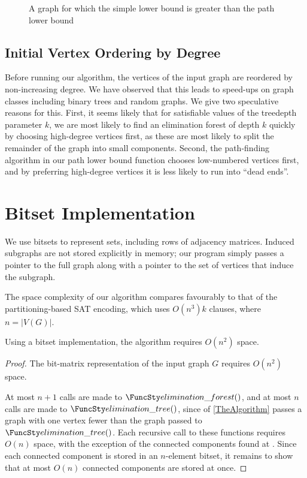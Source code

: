 {\begin{figure}[htb]
      \caption{A graph for which the simple lower bound is greater than the path lower bound}
      \label{fig:boundsgraph}
    \end{figure}

    \subsection{Initial Vertex Ordering by Degree}

    Before running our algorithm, the vertices of the input graph are reordered by
    non-increasing degree.  We have observed that this leads to speed-ups on graph
    classes including binary trees and random graphs.  We give two speculative reasons for
    this.  First, it seems likely that for satisfiable values of the treedepth
    parameter $k$, we are most likely to find an elimination forest of depth $k$ quickly
    by choosing high-degree vertices first, as these are most likely to split the remainder
    of the graph into small components.  Second, the path-finding algorithm in our path lower
    bound function chooses low-numbered vertices first, and by preferring high-degree vertices
    it is less likely to run into ``dead ends''.


    \section{Bitset Implementation}\label{sec:implementation}

    We use bitsets to represent sets, including rows of adjacency matrices.  Induced subgraphs
    are not stored explicitly in memory; our program simply passes a pointer to the full graph
    along with a pointer to the set of vertices that induce the subgraph.

    The space complexity of our algorithm compares favourably to that
    of the partitioning-based SAT encoding, which uses $O(n^3)k$ clauses, where $n=|V(G)|$.

    \begin{proposition}\label{spacetheorem}
    Using a bitset implementation, the algorithm requires $O(n^2)$ space.
    \end{proposition}
    \begin{proof}
      The bit-matrix representation of the input graph $G$ requires $O(n^2)$ space.

      At most
      $n+1$ calls are made to $\TDGeneral()$, and at most $n$ calls are made to
      $\TDConnected()$, since  of \cref{TheAlgorithm}
      passes a graph with one vertex fewer than the graph passed to $\TDConnected()$.
      Each recursive call to these functions requires $O(n)$ space, with the exception
      of the connected components found at .  Since each
      connected component is stored in an $n$-element bitset, it remains to show that
      at most $O(n)$ connected components are stored at once.


\end{proof}}
